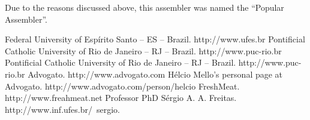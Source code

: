 \documentclass[a4paper,12pt]{book}
\begin{document}
Due to the reasons discussed above, this assembler was named the ``Popular Assembler''.

\begin{thebibliography}{9}
 Federal University of Esp\'irito Santo -- ES -- Brazil. http://www.ufes.br
 Pontificial Catholic University of Rio de Janeiro -- RJ -- Brazil. http://www.puc-rio.br
 Pontificial Catholic University of Rio de Janeiro -- RJ -- Brazil. http://www.puc-rio.br
Advogato. http://www.advogato.com
H\'elcio Mello's personal page at Advogato. http://www.advogato.com/person/helcio
FreshMeat. http://www.freahmeat.net
Professor PhD S\'ergio A. A. Freitas. http://www.inf.ufes.br/~sergio.

\end{thebibliography}
\end{document}
